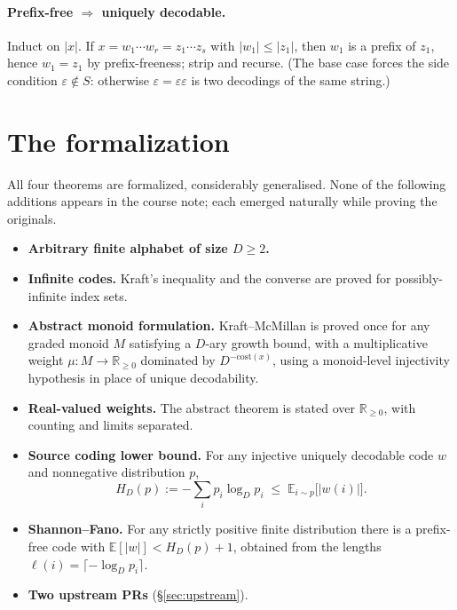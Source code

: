 \documentclass[11pt]{article}
\begin{document}
\paragraph{Prefix-free $\Rightarrow$ uniquely decodable.} Induct on $|x|$.
If $x = w_1 \cdots w_r = z_1 \cdots z_s$ with $|w_1| \le |z_1|$, then $w_1$
is a prefix of $z_1$, hence $w_1 = z_1$ by prefix-freeness; strip and
recurse. (The base case forces the side condition $\varepsilon \notin S$:
otherwise $\varepsilon = \varepsilon\varepsilon$ is two decodings of the
same string.)

\section{The formalization}
\label{sec:formalization}

All four theorems are formalized, considerably generalised. None of the
following additions appears in the course note; each emerged naturally
while proving the originals.

\begin{itemize}[leftmargin=1.5em,itemsep=1pt]
  \item \textbf{Arbitrary finite alphabet of size $D \ge 2$.}
  \item \textbf{Infinite codes.} Kraft's inequality and the converse are
    proved for possibly-infinite index sets.
  \item \textbf{Abstract monoid formulation.} Kraft--McMillan is proved
    once for any graded monoid $M$ satisfying a $D$-ary growth bound, with
    a multiplicative weight
    $\mu\colon M \to \mathbb{R}_{\ge 0}$ dominated by
    $D^{-\mathrm{cost}(x)}$, using a monoid-level injectivity hypothesis
    in place of unique decodability.
  \item \textbf{Real-valued weights.} The abstract theorem is stated over
    $\mathbb{R}_{\ge 0}$, with counting and limits separated.
  \item \textbf{Source coding lower bound.} For any injective uniquely
    decodable code $w$ and nonnegative distribution $p$,
    \[
      H_D(p) := -\!\sum_i p_i \log_D p_i \;\le\; \mathbb{E}_{i \sim p}\bigl[|w(i)|\bigr].
    \]
  \item \textbf{Shannon--Fano.} For any strictly positive finite
    distribution there is a prefix-free code with
    $\mathbb{E}[|w|] < H_D(p) + 1$, obtained from the lengths
    $\ell(i) = \lceil -\log_D p_i \rceil$.
  \item \textbf{Two upstream PRs} (\S\ref{sec:upstream}).
\end{itemize}
\end{document}
